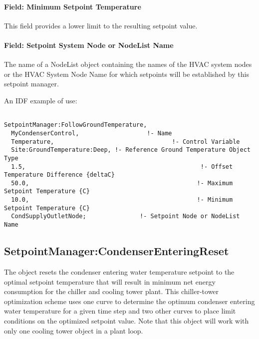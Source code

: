 \paragraph{Field: Minimum Setpoint Temperature}\label{field-minimum-setpoint-temperature-7}

This field provides a lower limit to the resulting setpoint value.

\paragraph{Field: Setpoint System Node or NodeList Name}\label{field-setpoint-system-node-or-nodelist-name-1}

The name of a NodeList object containing the names of the HVAC system nodes or the HVAC System Node Name for which setpoints will be established by this setpoint manager.

An IDF example of use:

\begin{lstlisting}

SetpointManager:FollowGroundTemperature,
  MyCondenserControl,                   !- Name
  Temperature,                                 !- Control Variable
  Site:GroundTemperature:Deep, !- Reference Ground Temperature Object Type
  1.5,                                                 !- Offset Temperature Difference {deltaC}
  50.0,                                               !- Maximum Setpoint Temperature {C}
  10.0,                                               !- Minimum Setpoint Temperature {C}
  CondSupplyOutletNode;               !- Setpoint Node or NodeList Name
\end{lstlisting}

\subsection{SetpointManager:CondenserEnteringReset}\label{setpointmanagercondenserenteringreset}

The object resets the condenser entering water temperature setpoint to the optimal setpoint temperature that will result in minimum net energy consumption for the chiller and cooling tower plant. This chiller-tower optimization scheme uses one curve to determine the optimum condenser entering water temperature for a given time step and two other curves to place limit conditions on the optimized setpoint value. Note that this object will work with only one cooling tower object in a plant loop.

